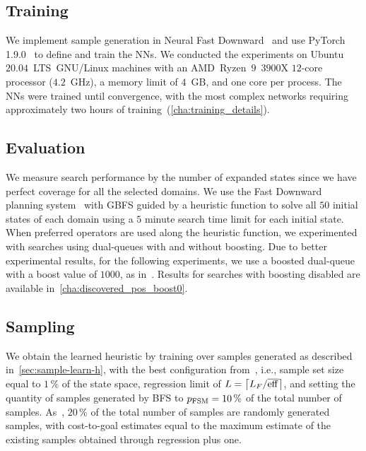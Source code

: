 \documentclass[ppgc,diss,english]{iiufrgs}
\providecommand{\ceil}[1]{\ensuremath{\left\lceil #1\right\rceil}}
\begin{document}



\subsection{Training}
\label{sec:exp-training}
We implement sample generation in Neural Fast Downward~\cite{Ferber.etal/2020a} and use PyTorch 1.9.0~\cite{Paszke/2019} to define and train the NNs. We conducted the experiments on Ubuntu~$20.04$~LTS~GNU/Linux machines with an AMD~Ryzen~$9$~$3900$X $12$-core processor ($4.2$~GHz), a memory limit of $4$~GB, and one core per process. The NNs were trained until convergence, with the most complex networks requiring approximately two hours of training~(\vref{cha:training_details}).%

\subsection{Evaluation}
\label{sec:exp-evaluation}
We measure search performance by the number of expanded states since we have perfect coverage for all the selected domains. We use the Fast Downward planning system~\cite{Helmert/2006} with GBFS guided by a heuristic function to solve all $50$ initial states of each domain using a $5$ minute search time limit for each initial state.
When preferred operators are used along the heuristic function, we experimented with searches using dual-queues with and without boosting. Due to better experimental results, for the following experiments, we use a boosted dual-queue with a boost value of $1000$, as in~\citet{Richter.Helmert/2009}. Results for searches with boosting disabled are available in~\vref{cha:discovered_pos_boost0}.

\subsection{Sampling}
\label{sec:exp-sampling}
We obtain the learned heuristic \hnn by training over samples generated as described in~\cref{sec:sample-learn-h}, with the best configuration from~\citet{Bettker.etal/2022}, i.e., sample set size equal to $1\,\%$ of the state space, regression limit of $L=\ceil{\facts/\overline{\eff}}$, and setting the quantity of samples generated by BFS to $p_{\text{FSM}}=10\,\%$ of the total number of samples. As~\citet{Bettker.etal/2022}, $20\,\%$ of the total number of samples are randomly generated samples, with cost-to-goal estimates equal to the maximum estimate of the existing samples obtained through regression plus one.
\end{document}
